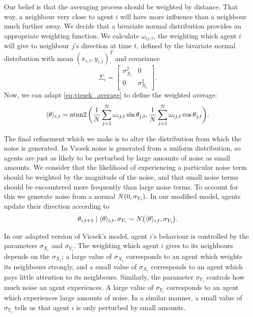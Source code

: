 Our belief is that the averaging process should be weighted by distance. That way, a neighbour very 
close to agent $i$ will have more influence than a neighbour much further away. We decide that a 
bivariate normal distribution provides an appropriate weighting function. We calculate $\omega_{ij, 
t}$, the weighting which agent $i$ will give to neighbour $j$'s direction at time $t$, defined by the 
bivariate normal distribution with mean $(x_{i, t}, y_{i, t})^T$ and covariance
\[
	\Sigma_i = \begin{bmatrix}
		\sigma_{X_i}^2 & 0 \\
		0 & \sigma_{X_i}^2
	\end{bmatrix}.
\]
Now, we can adapt \cref{eq:vicsek_average} to define the weighted average:
\begin{equation}
\label{eq:weighted_average}
	\langle \theta \rangle_{i, t} = \operatorname{atan2} \bigg( \frac{1}{N} \sum_{j=1}^N \omega_{ij, t} 
\sin{\theta_{j ,t}}, \frac{1}{N} \sum_{j=1}^N \omega_{ij, t} \cos{\theta_{j, t}} \bigg).
\end{equation}

The final refinement which we make is to alter the distribution from which the noise is generated. In 
Vicsek noise is generated from a uniform distribution, so agents are just as likely to be perturbed 
by large amounts of noise as small amounts. We consider that the likelihood of experiencing a 
particular noise term should be weighted by the magnitude of the noise, and that small noise terms 
should be encountered more frequently than large noise terms. To account for this we generate noise 
from a normal $N(0, \sigma_{Y_i})$. In our modified model, agents update their direction 
according to
\begin{equation}
\label{eq:weighted_update}
	\theta_{i,t+1} \mid \langle \theta \rangle_{i, t}, \sigma_{Y_i} \sim N\big(\langle \theta 
\rangle_{i, t}, \sigma_{Y_i}\big).
\end{equation}

In our adapted version of Vicsek's model, agent $i$'s behaviour is controlled by the parameters 
$\sigma_{X_i}$ and $\sigma_{Y_i}$. The weighting which agent $i$ gives to its neighbours depends on 
the $\sigma_{X_i}$; a large value of $\sigma_{X_i}$ corresponds to an agent which weights its 
neighbours strongly, and a small value of $\sigma_{X_i}$ corresponds to an agent which pays little 
attention to its neighbours. Similarly, the parameter $\sigma_{Y_i}$ controls how much noise an agent 
experiences. A large value of $\sigma_{Y_i}$ corresponds to an agent which experiences large amounts 
of noise. In a similar manner, a small value of $\sigma_{Y_i}$ tells us that agent $i$ is only 
perturbed by small amounts.

